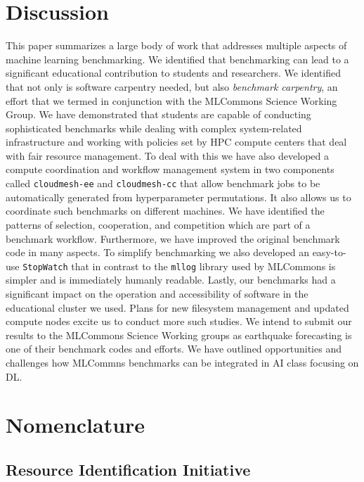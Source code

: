 \documentclass[utf8]{FrontiersinVancouver} %
\newcommand{\TODO}[2]{\todo[inline]{{\bf \color{red} #1} #2}}
\begin{document}
\section{Discussion}
\label{sec:conclusion}


This paper summarizes a large body of work that addresses multiple aspects of machine learning benchmarking. We identified that benchmarking can lead to a significant educational contribution to students and researchers. We identified that not only is software carpentry needed, but also {\em benchmark carpentry}, an effort that we termed in conjunction with the MLCommons Science Working Group. We have demonstrated that students are capable of conducting sophisticated benchmarks while dealing with complex system-related infrastructure and working with policies set by HPC compute centers that deal with fair resource management. To deal with this we have also developed a compute coordination and workflow management system in two components called \verb|cloudmesh-ee| and \verb|cloudmesh-cc| that allow benchmark jobs to be automatically generated from hyperparameter permutations. It also allows us to coordinate such benchmarks on different machines. We have identified the patterns of selection, cooperation, and competition which are part of a benchmark workflow. Furthermore, we have improved the original benchmark code in many aspects. To simplify benchmarking we also developed an easy-to-use \verb|StopWatch| that in contrast to the \verb|mllog| library used by MLCommons is simpler and is immediately humanly readable. Lastly, our benchmarks had a significant impact on the operation and accessibility of software in the educational cluster we used. Plans for new filesystem management and updated compute nodes excite us to conduct more such studies. We intend to submit our results to the MLCommons Science Working groups as earthquake forecasting is one of their benchmark codes and efforts.
We have outlined opportunities and challenges how MLCommns benchmarks can be integrated in AI class focusing on DL.

\clearpage

\section{Nomenclature}

\subsection{Resource Identification Initiative}
\end{document}
